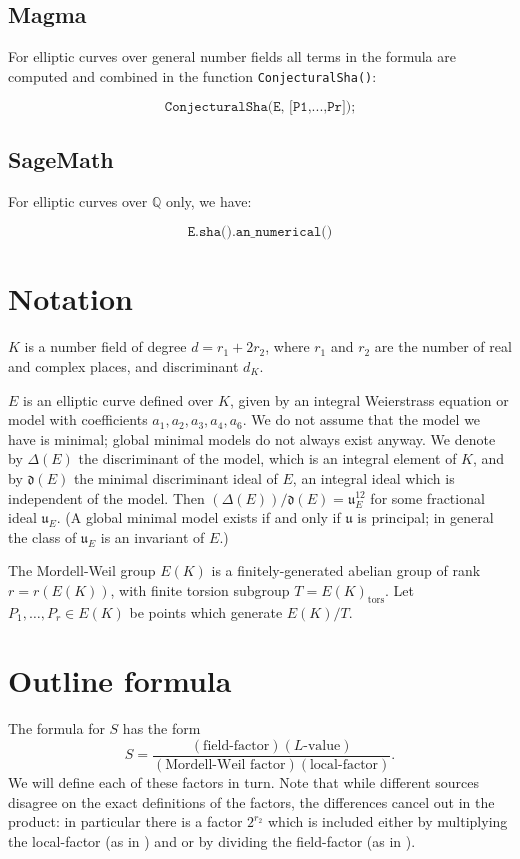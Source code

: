 \documentclass{amsart}
\newcommand{\software}[1]{\textsf{#1}} %
\newcommand{\Sage}{\software{SageMath}{}\ }
\newcommand{\Magma}{\software{Magma}{}\ }
\newcommand\Q{\mathbb{Q}}
\DeclareMathOperator{\tors}{tors}
\begin{document}
\subsection{\Magma}\label{magma}

For elliptic curves over general number fields all terms in the formula
are computed and combined in the function \texttt{ConjecturalSha()}:

\[
\texttt{ConjecturalSha(E,\ {[}P1,...,Pr{]});}
\]

\subsection{\Sage}\label{sage}

For elliptic curves over \(\Q\) only, we have:

\[
\texttt{E.sha().an\_numerical()}
\]

\section{Notation}\label{notation}

\(K\) is a number field of degree \(d=r_1+2r_2\), where \(r_1\) and
\(r_2\) are the number of real and complex places, and discriminant
\(d_K\).

\(E\) is an elliptic curve defined over \(K\), given by an integral
Weierstrass equation or model with coefficients \(a_1,a_2,a_3,a_4,a_6\).
We do not assume that the model we have is minimal; global minimal
models do not always exist anyway. We denote by \(\Delta(E)\) the
discriminant of the model, which is an integral element of \(K\), and by
\(\mathfrak{d}(E)\) the minimal discriminant ideal of \(E\), an integral
ideal which is independent of the model. Then
\((\Delta(E))/\mathfrak{d}(E) = \mathfrak{u}_E^{12}\) for some fractional
ideal \(\mathfrak{u}_E\). (A global minimal model exists if and only if
\(\mathfrak{u}\) is principal; in general the class of \(\mathfrak{u}_E\)
is an invariant of \(E\).)

The Mordell-Weil group \(E(K)\) is a finitely-generated abelian group of
rank \(r=r(E(K))\), with finite torsion subgroup \(T=E(K)_{\tors}\). Let
\(P_1,\dots,P_r\in E(K)\) be points which generate \(E(K)/T\).

\section{Outline formula}\label{outline-formula}

The formula for \(S\) has the form
\[
S = \frac{(\text{field-factor})(\text{$L$-value})}{(\text{Mordell-Weil factor})(\text{local-factor})}.
\]
We will define each of these factors in turn.  Note that while
different sources disagree on the exact definitions of the factors,
the differences cancel out in the product: in particular there is a
factor $2^{r_2}$ which is included either by multiplying the
local-factor (as in \cite{Dok}) and or by dividing the field-factor
(as in \cite{Tate}).
\end{document}
